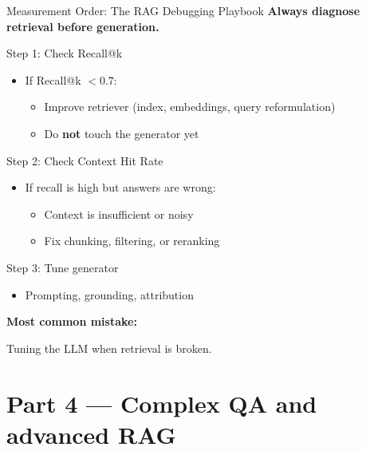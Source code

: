 \documentclass[aspectratio=169, xcolor=table]{beamer}
\newif\ifanimated
\newcommand{\cpause}{\ifanimated\pause\fi}
\begin{document}
\begin{frame}[shrink=10]{Measurement Order: The RAG Debugging Playbook}
\textbf{Always diagnose retrieval before generation.}

\vspace{0.7em}
\begin{block}{Step 1: Check Recall@k}
\begin{itemize}
  \item If Recall@k $< 0.7$:
  \begin{itemize}
    \item Improve retriever (index, embeddings, query reformulation)
    \item Do \textbf{not} touch the generator yet
  \end{itemize}
\end{itemize}
\end{block}

\cpause
\begin{block}{Step 2: Check Context Hit Rate}
\begin{itemize}
  \item If recall is high but answers are wrong:
  \begin{itemize}
    \item Context is insufficient or noisy
    \item Fix chunking, filtering, or reranking
  \end{itemize}
\end{itemize}
\end{block}

\cpause
\begin{block}{Step 3: Tune generator}
\begin{itemize}
  \item Prompting, grounding, attribution
\end{itemize}
\end{block}

\vspace{0.5em}
\textbf{Most common mistake:}
\begin{center}
\large Tuning the LLM when retrieval is broken.
\end{center}
\end{frame}



\section{Part 4 --- Complex QA and advanced RAG}
\end{document}
